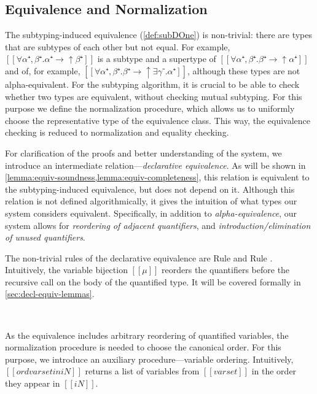 \documentclass[a4,natbib=false]{article}
\newcommand{\ruleref}[1]{Rule \nameref{#1}}
\begin{document}
\subsection{Equivalence and Normalization}
\label{sec:equivalence-normalization}

The subtyping-induced equivalence (\cref{def:subDOne}) is non-trivial:
there are types that are subtypes of each other but not equal. 
For example, $[[∀α⁺,β⁺.α⁺ → ↑β⁺]]$ is a subtype and a supertype of $[[∀α⁺,β⁺.β⁺ → ↑α⁺]]$
and of, for example, $[[∀α⁺,β⁺.β⁺ → ↑∃γ⁻.α⁺]]$, 
although these types are not alpha-equivalent.
For the subtyping algorithm, it is crucial to be able to check whether
two types are equivalent, without checking mutual subtyping. 
For this purpose we define the normalization procedure, 
which allows us to uniformly choose the representative type of the equivalence class.
This way, the equivalence checking is reduced to normalization and equality checking. 

For clarification of the proofs and better understanding of the system, 
we introduce an intermediate relation---\emph{declarative equivalence}. 
As will be shown in \cref{lemma:equiv-soundness,lemma:equiv-completeness}, 
this relation is equivalent to the subtyping-induced equivalence, but does not 
depend on it. Although this relation is not defined algorithmically, 
it gives the intuition of what types our system considers equivalent.
Specifically, in addition to \emph{alpha-equivalence}, 
our system allows for \emph{reordering of adjacent quantifiers},
and \emph{introduction/elimination of unused quantifiers}.

The non-trivial rules of the declarative equivalence are
\ruleref{\ottdruleEOneForallLabel} and \ruleref{\ottdruleEOneExistsLabel}.
Intuitively, the variable bijection $[[μ]]$ reorders the quantifiers before
the recursive call on the body of the quantified type. 
It will be covered formally in \cref{sec:decl-equiv-lemmas}.

\begin{definition}
  \hfill
  
  \begin{multicols}{2}
  \ottdefnEOneNeq{}
  \columnbreak\\
  \ottdefnEOnePeq{}
  \end{multicols}

\end{definition}

As the equivalence includes arbitrary reordering of quantified variables,
the normalization procedure is needed to choose the canonical order.
For this purpose, we introduce an auxiliary procedure---variable ordering. 
Intuitively, $[[ord varset in iN]]$ returns a list of variables from $[[varset]]$
in the order they appear in $[[iN]]$.
\end{document}
